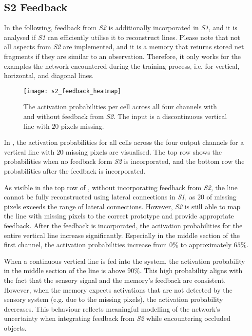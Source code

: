 \subsection{S2 Feedback}
In the following, feedback from \emph{S2} is additionally incorporated in \emph{S1}, and it is analysed if \emph{S1} can efficiently utilise it to reconstruct lines.
Please note that not all aspects from \emph{S2} are implemented, and it is a memory that returns stored net fragments if they are similar to an observation.
Therefore, it only works for the examples the network encountered during the training process, i.e. for vertical, horizontal, and diagonal lines.

\begin{figure}[h]
    \centering
    \texttt{[image: s2\_feedback\_heatmap]}
    \caption[Activation probabilities with and without \emph{S2} feedback]{The activation probabilities per cell across all four channels with and without feedback from \emph{S2}. The input is a discontinuous vertical line with $20$ pixels missing.}
\end{figure}
%
In , the activation probabilities for all cells across the four output channels for a vertical line with $20$ missing pixels are visualised.
The top row shows the probabilities when no feedback form \emph{S2} is incorporated, and the bottom row the probabilities after the feedback is incorporated.

As visible in the top row of , without incorporating feedback from \emph{S2}, the line cannot be fully reconstructed using lateral connections in \emph{S1}, as $20$ of missing pixels exceeds the range of lateral connections. However, \emph{S2} is still able to map the line with missing pixels to the correct prototype and provide appropriate feedback. After the feedback is incorporated, the activation probabilities for the entire vertical line increase significantly. Especially in the middle section of the first channel, the activation probabilities increase from $0\%$ to approximately $65\%$.

When a continuous vertical line is fed into the system, the activation probability in the middle section of the line is above $90\%$.
This high probability aligns with the fact that the sensory signal and the memory's feedback are consistent.
However, when the memory expects activations that are not detected by the sensory system (e.g. due to the missing pixels), the activation probability decreases. This behaviour reflects meaningful modelling of the network's uncertainty when integrating feedback from \emph{S2} while encountering occluded objects.

